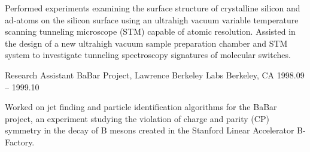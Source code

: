 \begin{cventries}
    {
      \begin{cvitems}
        Performed experiments examining the surface structure of crystalline silicon and ad-atoms on the silicon surface using an ultrahigh vacuum variable temperature scanning tunneling microscope (STM) capable of atomic resolution. Assisted in the design of a new ultrahigh vacuum sample preparation chamber and STM system to investigate tunneling spectroscopy signatures of molecular switches.
      \end{cvitems}
    }
  \cventry
    {Research Assistant}
    {BaBar Project, Lawrence Berkeley Labs}
    {Berkeley, CA}
    {1998.09 -- 1999.10}
    {
      \begin{cvitems}
        Worked on jet finding and particle identiﬁcation algorithms for the BaBar project, an experiment studying the violation of charge and parity (CP) symmetry in the decay of B mesons created in the Stanford Linear Accelerator B-Factory.
      \end{cvitems}
    }
\end{cventries}
